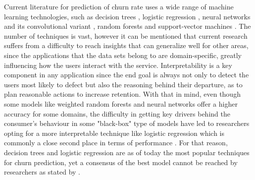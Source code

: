 \documentclass{kththesis}
\begin{document}
Current literature for prediction of churn rate uses a wide range of machine learning technologies, such as decision trees \citep{Pudipeddi2014}\citep{Hassouna2015} \citep{Ballings2012} \citep{Khan2015}, logistic regression \citep{GurAli2014}, neural networks \citep{Runge2014} and its convolutional variant \citep{Wangperawong2016}, random forests \citep{Dror2012} and support-vector machines \citep{coussement2008churn}. The number of techniques is vast, however it can be mentioned that current research suffers from a difficulty to reach insights that can generalize well for other areas, since the applications that the data sets belong to are domain-specific, greatly influencing how the users interact with the service. Interpretability is a key component in any application since the end goal is always not only to detect the users most likely to defect but also the reasoning behind their departure, as to plan reasonable actions to increase retention. With that in mind, even though some models like weighted random forests \citep{Burez2009} and neural networks \citep{Runge2014} offer a higher accuracy for some domains, the difficulty in getting key drivers behind the consumer's behaviour in some "black-box" type of models have led to researchers opting for a more interpretable technique like logistic regression which is commonly a close second place in terms of performance \citep{Runge2014} \citep{Dror2012}. For that reason, decision trees and logistic regression are as of today the most popular techniques for churn prediction, yet a consensus of the best model cannot be reached by researchers as stated by \citep{mahajan2015review}. 
\end{document}
